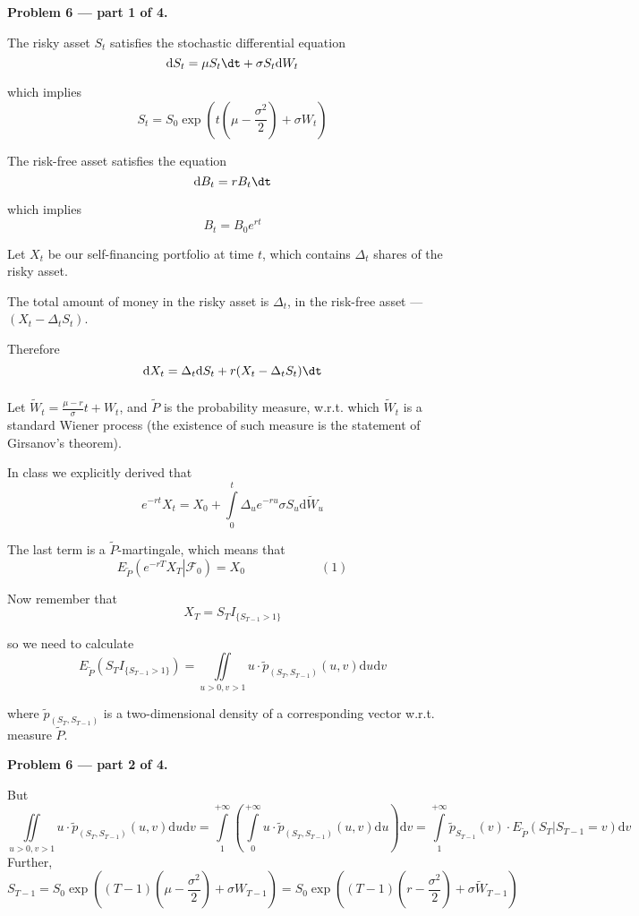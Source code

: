 \documentclass[12pt, a4paper]{article}
\newcommand{\cF}{\mathcal{F}}
\renewcommand{\FF}{\cF}
\newcommand{\ds}{\displaystyle}
\newcommand{\du}{\mathrm{d}u}
\newcommand{\dv}{\mathrm{d}v}
\begin{document}
\textbf{Problem 6 — part 1 of 4.}\par
The risky asset $S_{t}$ satisfies the stochastic differential equation $$\mathrm{d}S_{t} = \mu S_{t}\dt + \sigma S_{t}\mathrm{d}W_{t}$$\par which implies
$$
S_{t} = S_{0}\exp \left(t\left(\mu - \frac{\ds \sigma^{2}}{\ds 2}\right) + \sigma W_{t}\right)
$$\par
The risk-free asset satisfies the equation
$$
\mathrm{d}B_{t} = rB_{t}\dt
$$\par
which implies
$$
B_{t} = B_{0}e^{rt}
$$\par
Let $X_{t}$ be our self-financing portfolio at time $t$, which contains $\Delta_{t}$ shares of the risky asset.\par
The total amount of money in the risky asset is $\Delta_{t}$, in the risk-free asset — $(X_{t} - \Delta_{t}S_{t})$.\par
Therefore
$$
\mathrm{d}X_{t} = \Delta_{t}\mathrm{d}S_{t} + r(X_{t} - \Delta_{t}S_{t})\dt
$$\[\]\par
Let $\tilde{W}_{t} = \frac{\ds \mu - r}{\ds \sigma}t + W_{t}$, and $\tilde{P}$ is the probability measure, w.r.t. which $\tilde{W}_{t}$ is a standard Wiener process (the existence of such measure is the statement of Girsanov's theorem).\par
In class we explicitly derived that
$$
e^{-rt}X_{t} = X_{0} + \int\limits_{0}^{t}\Delta_{u}e^{-ru}\sigma S_{u}\mathrm{d}\tilde{W}_{u}
$$\par
The last term is a $\tilde{P}$-martingale, which means that
$$
E_{\tilde{P}}\left(\left.e^{-rT}X_{T}\right|\FF_{0}\right) = X_{0} \qquad\qquad\qquad (1)
$$\par
Now remember that
$$
X_{T} = S_{T}I_{\{S_{T-1} > 1\}}
$$\par
so we need to calculate
$$
E_{\tilde{P}}(S_{T}I_{\{S_{T-1} > 1\}}) = \iint\limits_{u > 0, v > 1}u\cdot \tilde{p}_{(S_{T}, S_{T-1})}(u,v)\du\dv
$$\par
where $\tilde{p}_{(S_{T}, S_{T-1})}$ is a two-dimensional density of a corresponding vector w.r.t. measure $\tilde{P}$.






\textbf{Problem 6 — part 2 of 4.}\par
But
\[
\iint\limits_{u > 0, v > 1}u\cdot \tilde{p}_{(S_{T}, S_{T-1})}(u,v)\du\dv = \int\limits_{1}^{+\infty}\left(\int\limits_{0}^{+\infty}u\cdot \tilde{p}_{(S_{T}, S_{T-1})}(u,v) \du\right)\dv = \int\limits_{1}^{+\infty}\tilde{p}_{S_{T-1}}(v)\cdot E_{\tilde{P}}\left(S_{T} | S_{T-1} = v\right)\dv
\]
Further,
\[
S_{T-1} = S_{0}\exp \left((T-1)\left(\mu - \frac{\ds \sigma^{2}}{\ds 2}\right) + \sigma W_{T-1}\right) = S_{0}\exp \left((T-1)\left(r - \frac{\ds \sigma^{2}}{\ds 2}\right) + \sigma \tilde{W}_{T-1}\right)
\]
\end{document}
